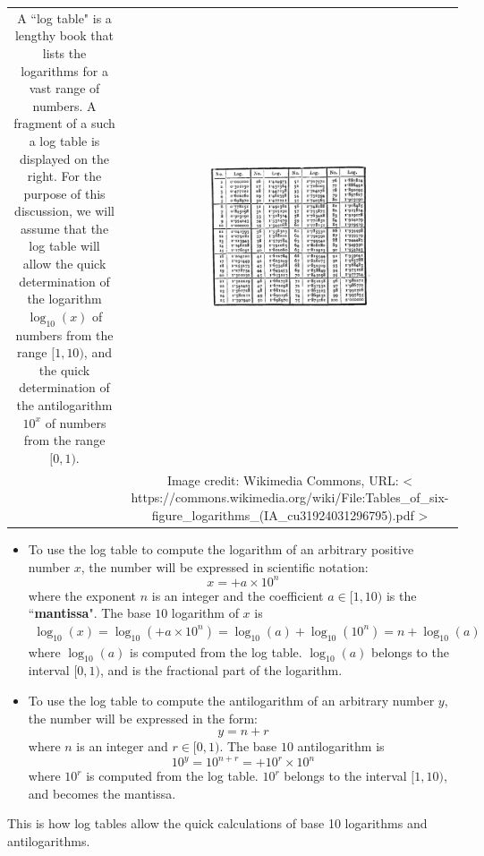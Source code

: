 \documentclass{article}
\begin{document}
\begin{tabular}{cc}
\parbox{0.5\textwidth}{
A ``log table" is a lengthy book that lists the logarithms for a vast range of numbers. A fragment of a such a log table is displayed on the right. For the purpose of this discussion, we will assume that the log table will allow the quick determination of the logarithm \(\log_{10}(x)\) of numbers from the range \([1, 10)\), and the quick determination of the antilogarithm \(10^x\) of numbers from the range \([0, 1)\). 
} & \parbox{0.5\textwidth}{
\includegraphics[width = 0.5\textwidth]{Log_table_fragment.png}
} \\
& \parbox{0.5\textwidth}{\footnotesize Image credit: Wikimedia Commons, URL: 
{\textless
https://commons.wikimedia.org/wiki/File:Tables\_of\_six-figure\_logarithms\_(IA\_cu31924031296795).pdf
\textgreater}
}
\end{tabular} 
\begin{itemize}
\item To use the log table to compute the logarithm of an arbitrary positive number \(x\), the number will be expressed in scientific notation: 
\[x = +a \times 10^n\] where the exponent \(n\) is an integer and the coefficient \(a \in [1, 10)\) is the ``{\bf mantissa}". 
The base \(10\) logarithm of \(x\) is 
\begin{align*}
\log_{10}(x) = \log_{10}(+a \times 10^n) = \log_{10}(a) + \log_{10}(10^n) = n + \log_{10}(a)
\end{align*} 
where \(\log_{10}(a)\) is computed from the log table. \(\log_{10}(a)\) belongs to the interval \([0, 1)\), and is the fractional part of the logarithm. 
\item To use the log table to compute the antilogarithm of an arbitrary number \(y\), the number will be expressed in the form: 
\[y = n + r\] where \(n\) is an integer and \(r \in [0, 1)\). 
The base \(10\) antilogarithm is 
\[10^y = 10^{n+r} = +10^r \times 10^n\]
where \(10^r\) is computed from the log table. \(10^r\) belongs to the interval \([1, 10)\), and becomes the mantissa.
\end{itemize}
This is how log tables allow the quick calculations of base 10 logarithms and antilogarithms. 
\end{document}
